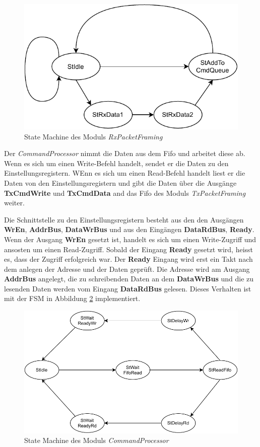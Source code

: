 \documentclass{article}
\begin{document}
\begin{figure}[tb]
    \includegraphics[width=\linewidth]{drawio/fsm_rx_packet_framing}
    \caption{State Machine des Moduls \textit{RxPacketFraming}}
    \label{fig:fsm_rx_packet_framing}
\end{figure}

Der \textit{CommandProcessor} nimmt die Daten aus dem Fifo und arbeitet diese ab. Wenn es sich um einen Write-Befehl handelt, sendet er die Daten zu den Einstellungsregistern. WEnn es sich um einen Read-Befehl handelt liest er die Daten von den Einstellungsregistern und gibt die Daten über die Ausgänge \textbf{TxCmdWrite} und \textbf{TxCmdData} and das Fifo des Moduls \textit{TxPacketFraming} weiter.

Die Schnittstelle zu den Einstellungsregistern besteht aus den den Ausgängen \textbf{WrEn}, \textbf{AddrBus}, \textbf{DataWrBus} und aus den Eingängen \textbf{DataRdBus}, \textbf{Ready}.
Wenn der Ausgang \textbf{WrEn} gesetzt ist, handelt es sich um einen Write-Zugriff und ansosten um einen Read-Zugriff. Sobald der Eingang \textbf{Ready} gesetzt wird, heisst es, dass der Zugriff erfolgreich war. Der \textbf{Ready} Eingang wird erst ein Takt nach dem anlegen der Adresse und der Daten geprüft. Die Adresse wird am Ausgang \textbf{AddrBus} angelegt, die zu schreibenden Daten an dem \textbf{DataWrBus} und die zu lesenden Daten werden vom Eingang \textbf{DataRdBus} gelesen. Dieses Verhalten ist mit der FSM in Abbildung \ref{fig:fsm_command_processor} implementiert.

\begin{figure}[tb]
    \includegraphics[width=\linewidth]{drawio/fsm_command_processor}
    \caption{State Machine des Moduls \textit{CommandProcessor}}
    \label{fig:fsm_command_processor}
\end{figure}
\end{document}
